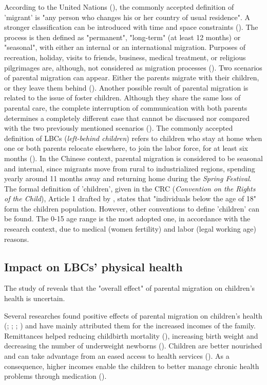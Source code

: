 According to the United Nations (\cite{united1998recommendations}), the commonly accepted definition of 'migrant' is "any person who changes his or her country of usual residence". A stronger classification can be introduced with time and space constraints (\cite{rossi2008impact}). The process is then defined as "permanent", "long-term" (at least 12 months) or "seasonal", with either an internal or an international migration. Purposes of recreation, holiday, visits to friends, business, medical treatment, or religious pilgrimages are, although, not considered as migration processes (\cite{united1998recommendations}). Two scenarios of parental migration can appear. Either the parents migrate with their children, or they leave them behind (\cite{rossi2008impact}). Another possible result of parental migration is related to the issue of foster children. Although they share the same loss of parental care, the complete interruption of communication with both parents determines a completely different case that cannot be discussed nor compared with the two previously mentioned scenarios (\cite{pilon2003foster}). The commonly accepted definition of LBCs (\textit{left-behind children}) refers to children who stay at home when one or both parents relocate elsewhere, to join the labor force, for at least six months (\cite{lu2011left}). In the Chinese context, parental migration is considered to be seasonal and internal, since migrants move from rural to industrialized regions, spending yearly around 11 months away and returning home during the \textit{Spring Festival}. The formal definition of 'children', given in the CRC (\textit{Convention on the Rights of the Child}), Article 1 drafted by \textcite{unicef1989convention}, states that "individuals below the age of 18" form the children population. However, other conventions to define 'children' can be found. The 0-15 age range is the most adopted one, in accordance with the research context, due to medical (women fertility) and labor (legal working age) reasons.

\subsection{Impact on LBCs' physical health}

The study of \textcite{guo2017effect} reveals that the "overall effect" of parental migration on children's health is uncertain. 

Several researches found positive effects of parental migration on children's health (\cite{mundial2006development}; \cite{acosta2007impact}; \cite{anton2010impact}; \cite{stillman2012impact}) and have mainly attributed them for the increased incomes of the family. Remittances helped reducing childbirth mortality (\cite{hildebrandt2005effects}), increasing birth weight and decreasing the number of underweight newborns (\cite{frank2002other}). Children are better nourished and can take advantage from an eased access to health services (\cite{nobles2006contribution}). As a consequence, higher incomes enable the children to better manage chronic health problems through medication (\cite{case2002economic}).

